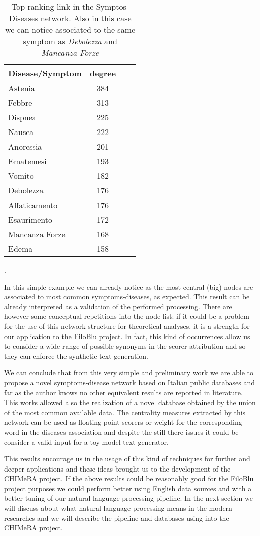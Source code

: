 \documentclass{standalone}
\begin{document}
\begin{table}[htbp]
\centering
\begin{tabular}{lccc}
\hline \rowcolor{darkgrayrow}
Disease/Symptom & degree \\
\hline
Astenia         & 384    \\
Febbre          & 313    \\
Dispnea         & 225    \\
Nausea          & 222    \\
Anoressia       & 201    \\
Ematemesi       & 193    \\
Vomito          & 182    \\
Debolezza       & 176    \\
Affaticamento   & 176    \\
Esaurimento     & 172    \\
Mancanza Forze  & 168    \\
Edema           & 158    \\
\hline
\end{tabular}
\caption{Top ranking link in the Symptos-Diseases network. Also in this case we can notice  associated to the same symptom as \emph{Debolezza} and \emph{Mancanza Forze}}.
\label{tab:rank}
\end{table}

In this simple example we can already notice as the most central (big) nodes are associated to most common symptoms-diseases, as expected.
This result can be already interpreted as a validation of the performed processing.
There are however some conceptual repetitions into the node list: if it could be a problem for the use of this network structure for theoretical analyses, it is a strength for our application to the FiloBlu project.
In fact, this kind of occurrences allow us to consider a wide range of possible synonyms in the scorer attribution and so they can enforce the synthetic text generation.

We can conclude that from this very simple and preliminary work we are able to propose a novel symptoms-disease network based on Italian public databases and far as the author knows no other equivalent results are reported in literature.
This works allowed also the realization of a novel database obtained by the union of the most common available data.
The centrality measures extracted by this network can be used as floating point scorers or weight for the corresponding word
in the diseases association and despite the still there issues it could be consider a valid input for a toy-model text generator.

This results encourage us in the usage of this kind of techniques for further and deeper applications and these ideas brought us to the development of the CHIMeRA project.
If the above results could be reasonably good for the FiloBlu project purposes we could perform better using English data sources and with a better tuning of our natural language processing pipeline.
In the next section we will discuss about what natural language processing means in the modern researches and we will describe the pipeline and databases using into the CHIMeRA project.
\end{document}
